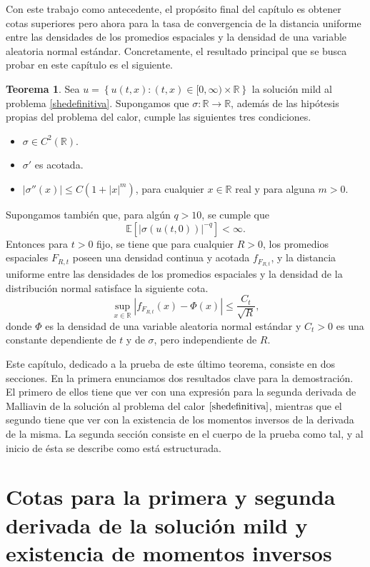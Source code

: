 \documentclass[letterpaper,twoside,12pt]{book}
\newcommand{\R}{\mathbb{R}}
\newcommand{\E}{\mathbb{E}}
\newcommand{\1}{\mathds{1}}
\newcommand{\abs}[1]{\left\lvert #1 \right\rvert}
\renewcommand{\to}{\rightarrow}
\theoremstyle{definition}
\theoremstyle{definition}
\newtheorem{teo}{Teorema}
\theoremstyle{remark}
\theoremstyle{definition}
\theoremstyle{definition}
\theoremstyle{definition}
\theoremstyle{definition}
\theoremstyle{definition}
\begin{document}
Con este trabajo como antecedente, el propósito final del capítulo es obtener cotas superiores pero ahora para la tasa de convergencia de la distancia uniforme entre las densidades de los promedios espaciales y la densidad de una variable aleatoria normal estándar. Concretamente, el resultado principal que se busca probar en este capítulo es el siguiente.
\begin{teo}\label{teoremaprincipal}
Sea $u=\left\{u(t,x):(t,x)\in [0,\infty)\times\R\right\}$ la solución mild al problema \eqref{shedefinitiva}. Supongamos que $\sigma:\R\to\R$, además de las hipótesis propias del problema del calor, cumple las siguientes tres condiciones.
\begin{itemize}
   \item $\sigma\in C^2(\R)$.
   \item $\sigma'$ es acotada.
   \item $\abs{\sigma''(x)}\leq C(1+\abs{x}^{m})$, \qquad para cualquier $x\in \R$ real y para alguna $m>0$.
\end{itemize}
Supongamos también que, para algún $q>10$, se cumple que 
\[
\E\left[\abs{\sigma(u(t,0))}^{-q}\right]<\infty.    
\]
Entonces para $t>0$ fijo, se tiene que para cualquier $R>0$, los promedios espaciales $F_{R,t}$ poseen una densidad continua y acotada $f_{F_{R,t}}$, y la distancia uniforme entre las densidades de los promedios espaciales y la densidad de la distribución normal satisface la siguiente cota.  
\[
\sup_{x\in \R} \abs{f_{F_{R,t}}(x)-\Phi(x)}\leq \frac{C_t}{\sqrt{R}},   
\]
donde $\Phi$ es la densidad de una variable aleatoria normal estándar y $C_t>0$ es una constante dependiente de $t$ y de $\sigma$, pero independiente de $R$.
\end{teo}

Este capítulo, dedicado a la prueba de este último teorema, consiste en dos secciones. En la primera enunciamos dos resultados clave para la demostración. El primero de ellos tiene que ver con una expresión para la segunda derivada de Malliavin de la solución al problema del calor $\eqref{shedefinitiva}$, mientras que el segundo tiene que ver con la existencia de los momentos inversos de la derivada de la misma. La segunda sección consiste en el cuerpo de la prueba como tal, y al inicio de ésta se describe como está estructurada.

\section{Cotas para la primera y segunda derivada de la solución mild y existencia de momentos inversos}
\end{document}
